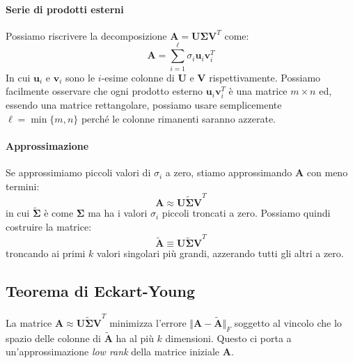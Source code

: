 \documentclass{article}
\begin{document}
            \paragraph{Serie di prodotti esterni} 
            Possiamo riscrivere la decomposizione $\mathbf{A} = \mathbf{U \Sigma V}^T$ come:
            \[\mathbf{A} = \sum_{i=1}^\ell \sigma_i \mathbf{u}_i\mathbf{v}_i^T\]
            In cui $\mathbf{u}_i$ e $\mathbf{v}_i$ sono le $i$-esime colonne di $\mathbf{U}$ e $\mathbf{V}$ rispettivamente. Possiamo 
            facilmente osservare che ogni prodotto esterno $\mathbf{u}_i\mathbf{v}_i^T$ è una matrice $m \times n$ ed, essendo una matrice 
            rettangolare, possiamo usare semplicemente $\ell = \min{\{m,n\}}$ perché le colonne rimanenti saranno azzerate. \\
            \paragraph{Approssimazione} Se approssimiamo piccoli valori di $\sigma_i$ a zero, stiamo approssimando $\mathbf{A}$ 
            con meno termini:
                \[\mathbf{A} \approx \mathbf{U\tilde{\Sigma}V}^T\]
            in cui $\mathbf{\tilde{\Sigma}}$ è come $\mathbf{\Sigma}$ ma ha i valori $\sigma_i$ piccoli troncati a zero. Possiamo quindi costruire la matrice:
            \[\tilde{\mathbf{A}} \equiv \mathbf{U\tilde{\Sigma}V}^T\]
            troncando ai primi $k$ valori singolari più grandi, azzerando tutti gli altri a zero.
            \subsection{Teorema di Eckart-Young}
            La matrice $\mathbf{A} \approx \mathbf{U\tilde{\Sigma}V}^T$ minimizza l'errore $\Vert \mathbf{A} - \tilde{\mathbf{A}} \Vert_F$ 
            soggetto al vincolo che lo spazio delle colonne di $\mathbf{\tilde{A}}$ ha al più $k$ dimensioni. Questo ci porta 
            a un'approssimazione \emph{low rank} della matrice iniziale $\mathbf{A}$.
\end{document}
